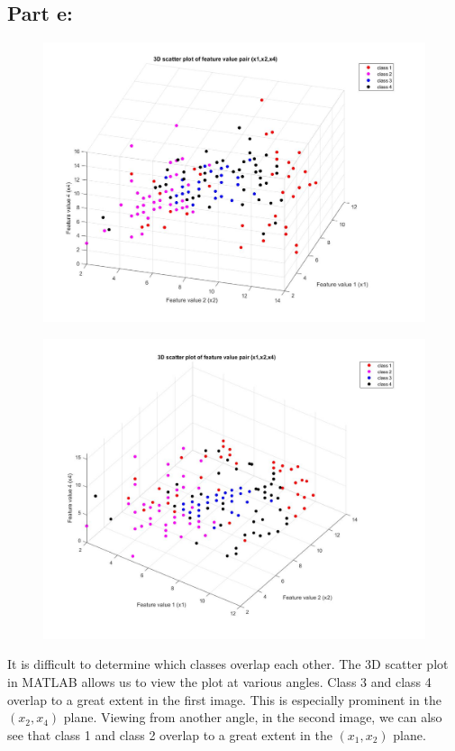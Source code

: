 \documentclass[a4paper,12pt]{article}
\begin{document}
\subsection*{Part e:}
\begin{figure}[H]
\centering
\includegraphics[scale=0.28]{q1pe.jpg}
\end{figure}
\begin{figure}[H]
\centering
\includegraphics[scale=0.28]{q1pe_2.jpg}
\end{figure}
\pagebreak
It is difficult to determine which classes overlap each other. The 3D scatter plot in MATLAB allows us to view the plot at various angles. Class 3 and class 4 overlap to a great extent in the first image. This is especially prominent in the $(x_2,x_4)$ plane. Viewing from another angle, in the second image, we can also see that class 1 and class 2 overlap to a great extent in the $(x_1,x_2)$ plane.
\end{document}

